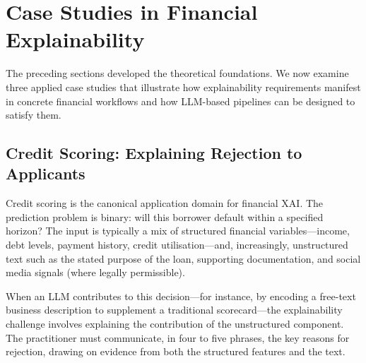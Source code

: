 \section{Case Studies in Financial Explainability}
\label{sec:ch12-case-studies}

The preceding sections developed the theoretical foundations. We now examine three applied
case studies that illustrate how explainability requirements manifest in concrete financial
workflows and how LLM-based pipelines can be designed to satisfy them.

\subsection{Credit Scoring: Explaining Rejection to Applicants}
\label{sec:ch12-credit-scoring}

Credit scoring is the canonical application domain for financial XAI. The prediction
problem is binary: will this borrower default within a specified horizon? The input is
typically a mix of structured financial variables---income, debt levels, payment history,
credit utilisation---and, increasingly, unstructured text such as the stated purpose of
the loan, supporting documentation, and social media signals (where legally permissible).

When an LLM contributes to this decision---for instance, by encoding a free-text business
description to supplement a traditional scorecard---the explainability challenge involves
explaining the contribution of the unstructured component. The practitioner must
communicate, in four to five phrases, the key reasons for rejection, drawing on evidence
from both the structured features and the text.

